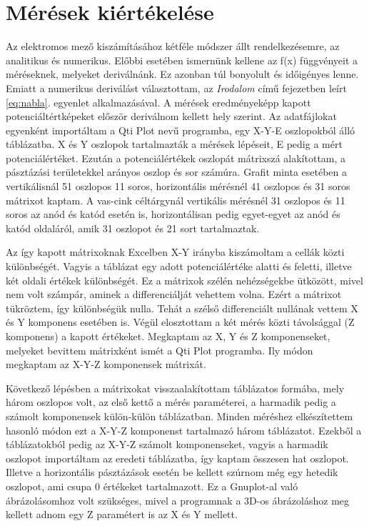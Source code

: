 \section{Mérések kiértékelése}

Az elektromos mező kiszámításához kétféle módszer állt rendelkezésemre, az analitikus és numerikus. Előbbi esetében ismernünk kellene az f(x) függvényeit a méréseknek, melyeket deriválnánk. Ez azonban túl bonyolult és időigényes lenne. Emiatt a numerikus deriválást választottam, az \emph{Irodalom} című fejezetben leírt \ref{eq:nabla}. egyenlet alkalmazásával. A mérések eredményeképp kapott potenciáltértképeket először deriválnom kellett hely szerint. Az adatfájlokat egyenként importáltam a Qti Plot nevű programba, egy X-Y-E oszlopokból álló táblázatba. X és Y oszlopok tartalmazták a mérések lépéseit, E pedig a mért potenciálértéket. Ezután a potenciálértékek oszlopát mátrixszá alakítottam, a pásztázási területekkel arányos oszlop és sor számúra. Grafit minta esetében a vertikálisnál 51 oszlopos 11 soros, horizontális mérésnél 41 oszlopos és 31 soros mátrixot kaptam. A vas-cink céltárgynál vertikális mérésnél 31 oszlopos és 11 soros az anód és katód esetén is, horizontálisan pedig egyet-egyet az anód és katód oldaláról, amik 31 oszlopot és 21 sort tartalmaztak. 

Az így kapott mátrixoknak Excelben X-Y irányba kiszámoltam a cellák közti különbségét. Vagyis a táblázat egy adott potenciálértéke alatti és feletti, illetve két oldali értékek különbségét. Ez a mátrixok szélén nehézségekbe ütközött, mivel nem volt számpár, aminek a differenciálját vehettem volna. Ezért a mátrixot tükröztem, így különbségük nulla. Tehát a szélső differenciált nullának vettem X és Y komponens esetében is. Végül elosztottam a két mérés közti távolsággal (Z komponens) a kapott értékeket. Megkaptam az X, Y és Z komponenseket, melyeket bevittem mátrixként ismét a Qti Plot programba. Ily módon megkaptam az X-Y-Z komponensek mátrixát.

Következő lépésben a mátrixokat visszaalakítottam táblázatos formába, mely három oszlopos volt, az első kettő a mérés paraméterei, a harmadik pedig a számolt komponensek külön-külön táblázatban. Minden méréshez elkészítettem hasonló módon ezt a X-Y-Z komponenst tartalmazó három táblázatot. Ezekből a táblázatokból pedig az X-Y-Z számolt komponenseket, vagyis a harmadik oszlopot importáltam az eredeti táblázatba, így kaptam összesen hat oszlopot. Illetve a horizontális pásztázások esetén be kellett szúrnom még egy hetedik oszlopot, ami csupa 0 értékeket tartalmazott. Ez a Gnuplot-al való ábrázolásomhoz volt szükséges, mivel a programnak a 3D-os ábrázoláshoz meg kellett adnom egy Z paramétert is az X és Y mellett. 

